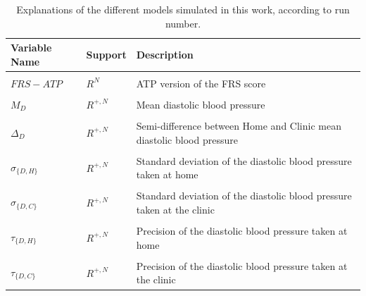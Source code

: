 \documentclass[
]{article}
\begin{document}
\begin{table}[!h]

\caption{\label{tab:runnumers}Explanations of the different models simulated in this work, according to run number.}
\centering
\begin{tabular}[t]{lll}
\toprule
Variable Name & Support & Description\\
\midrule
\cellcolor{gray!6}{$FRS-1998$} & \cellcolor{gray!6}{$R^N$} & \cellcolor{gray!6}{1998 version of the FRS score}\\
$FRS-ATP$ & $R^N$ & ATP version of the FRS score\\
\cellcolor{gray!6}{$M_S$} & \cellcolor{gray!6}{$R^{+,N}$} & \cellcolor{gray!6}{Mean systolic blood pressure}\\
$M_D$ & $R^{+,N}$ & Mean diastolic blood pressure\\
\cellcolor{gray!6}{$\Delta_S$} & \cellcolor{gray!6}{$R^{+,N}$} & \cellcolor{gray!6}{Semi-difference between Home and Clinic mean systolic blood pressure}\\
$\Delta_D$ & $R^{+,N}$ & Semi-difference between Home and Clinic mean diastolic blood pressure\\
\cellcolor{gray!6}{$\sigma_{\{S,H\}}$} & \cellcolor{gray!6}{$R^{+,N}$} & \cellcolor{gray!6}{Standard deviation of the systolic blood pressure taken at home}\\
$\sigma_{\{D,H\}}$ & $R^{+,N}$ & Standard deviation of the diastolic blood pressure taken at home\\
\cellcolor{gray!6}{$\sigma_{\{S,C\}}$} & \cellcolor{gray!6}{$R^{+,N}$} & \cellcolor{gray!6}{Standard deviation of the systolic blood pressure taken at the clinic}\\
$\sigma_{\{D,C\}}$ & $R^{+,N}$ & Standard deviation of the diastolic blood pressure taken at the clinic\\
\cellcolor{gray!6}{$\tau_{\{S,H\}}$} & \cellcolor{gray!6}{$R^{+,N}$} & \cellcolor{gray!6}{Precision of the systolic blood pressure taken at home}\\
$\tau_{\{D,H\}}$ & $R^{+,N}$ & Precision of the diastolic blood pressure taken at home\\
\cellcolor{gray!6}{$\tau_{\{S,C\}}$} & \cellcolor{gray!6}{$R^{+,N}$} & \cellcolor{gray!6}{Precision of the systolic blood pressure taken at the clinic}\\
$\tau_{\{D,C\}}$ & $R^{+,N}$ & Precision of the diastolic blood pressure taken at the clinic\\
\bottomrule
\end{tabular}
\end{table}
\end{document}
